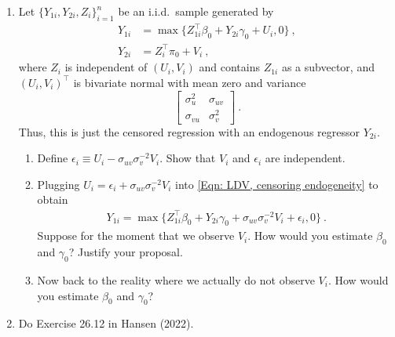 \documentclass[11 pt, a4paper]{article}
\begin{document}
\begin{enumerate}
  \item Let $\{Y_{1i}, Y_{2i},Z_i\}_{i=1}^n$ be an i.i.d.\ sample generated by
  \begin{align}
   Y_{1i}&=\max\{Z_{1i}^\intercal\beta_0+Y_{2i}\gamma_0+U_i,0\}~,\label{Eqn: LDV, censoring endogeneity}\\
   Y_{2i}&=Z_i^\intercal \pi_0+V_i~,
   \end{align}
   where $Z_i$ is independent of $(U_i,V_i)$ and contains $Z_{1i}$ as a subvector, and $(U_i,V_i)^\intercal$ is bivariate normal with mean zero and variance
   \[
   \begin{bmatrix}
   \sigma_u^2 & \sigma_{uv}\\
   \sigma_{vu} & \sigma_v^2
   \end{bmatrix}~.
   \]
   Thus, this is just the censored regression with an endogenous regressor $Y_{2i}$.
   \begin{enumerate}
     \item Define $\epsilon_i\equiv U_i-\sigma_{uv}\sigma_v^{-2} V_i$. Show that $V_i$ and $\epsilon_i$ are independent.
     \item Plugging $U_i=\epsilon_i+\sigma_{uv}\sigma_v^{-2} V_i$ into \eqref{Eqn: LDV, censoring endogeneity} to obtain
     \begin{align}
      Y_{1i}=\max\{Z_{1i}^\intercal\beta_0+Y_{2i}\gamma_0+\sigma_{uv}\sigma_v^{-2}V_i+\epsilon_i,0\}~.
     \end{align}
     Suppose for the moment that we observe $V_i$. How would you estimate $\beta_0$ and $\gamma_0$? Justify your proposal.

     \item Now back to the reality where we actually do not observe $V_i$. How would you estimate $\beta_0$ and $\gamma_0$?

   \end{enumerate}

  \item Do Exercise 26.12 in Hansen (2022).

\end{enumerate}
\end{document}
